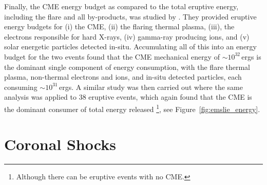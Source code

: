 Finally, the CME energy budget as compared to the total eruptive energy, including the flare and all by-products, was studied by \citet{emslie2004}. They provided eruptive energy budgets for (i) the CME, (ii) the flaring thermal plasma, (iii), the electrons responsible for hard X-rays, (iv) gamma-ray producing ions, and (v) solar energetic particles detected in-situ. Accumulating all of this into an energy budget for the two events found that the CME mechanical energy of $\sim10^{32}$\,ergs is the dominant single component of energy consumption, with the flare thermal plasma, non-thermal electrons and ions, and in-situ detected particles, each consuming $\sim10^{31}$\,ergs. A similar study was then carried out where the same analysis was applied to 38 eruptive events, which again found that the CME is the dominant consumer of total energy released \citep{emslie2012}\footnote{{\color{blue}Although there can be eruptive events with no CME.}}, see Figure~\ref{fig:emslie_energy}. 




\section{Coronal Shocks}\label{sec:21}

